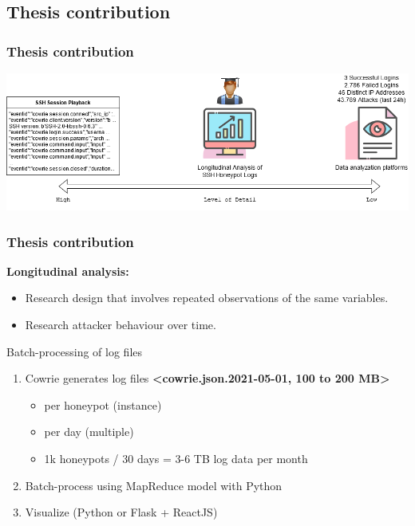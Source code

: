 \documentclass[11pt,t,usepdftitle=false,aspectratio=169]{beamer}
\begin{document}
\subsection{Thesis contribution}
\begin{frame}
\frametitle{Thesis contribution}
\begin{center}
	\includegraphics[width=140mm]{_images/Motivation_Overview.png}
\end{center}
\end{frame}
\begin{frame}
	\frametitle{Thesis contribution}	
	\textbf{Longitudinal analysis:}
	\begin{itemize}
		\item Research design that involves repeated observations of the same variables.		
		\item Research attacker behaviour over time.
	\end{itemize}	
	\begin{block}{Batch-processing of log files}
		\begin{enumerate}
			\item Cowrie generates log files \textbf{<cowrie.json.2021-05-01, 100 to 200 MB>}
			\begin{itemize}
				\item per honeypot (instance)
				\item per day (multiple)
				\item 1k honeypots / 30 days = 3-6 TB log data per month
			\end{itemize} 
			\item Batch-process using MapReduce model with Python
			\item Visualize (Python or Flask + ReactJS)	
		\end{enumerate}
	\end{block}
\end{frame}
\end{document}

